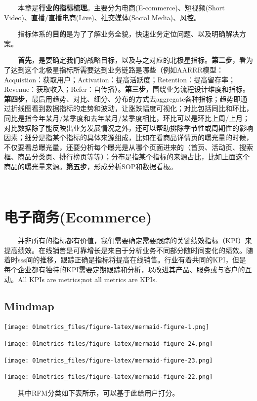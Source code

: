 \documentclass[
  letterpaper,
  DIV=11,
  numbers=noendperiod]{scrreprt}
\begin{document}
  本章是\textbf{行业的指标梳理}。主要分为电商(E-commerce)、短视频(Short
Video)、直播/直播电商(Live)、社交媒体(Social Media)、风控。

  指标体系的\textbf{目的}是为了了解业务全貌，快速业务定位问题、以及明确解决方案。

  \textbf{首先}，是要确定我们的战略目标，以及与之对应的北极星指标。\textbf{第二步}，看为了达到这个北极星指标所需要达到业务链路是哪些（例如AARRR模型：Acquistion：获取用户；Activation：提高活跃度；Retention：提高留存率；Revenue：获取收入；Refer：自传播）。\textbf{第三步}，围绕业务流程设计维度和指标。\textbf{第四步}，最后用趋势、对比、细分、分布的方式去aggregate各种指标；{趋势}即通过折线图看到数据指标的走势和波动，让涨跌幅度可视化；{对比}包括同比和环比，同比是指今年某月/某季度和去年某月/某季度相比，环比可以是环比上周/上月；对比数据除了能反映出业务发展情况之外，还可以帮助排除季节性或周期性的影响因素；{细分}是指某个指标的具体来源组成，比如在看商品详情页的曝光量的时候，不仅要看总曝光量，还要分析每个曝光是从哪个页面进来的（首页、活动页、搜索框、商品分类页、排行榜页等等）；{分布}是指某个指标的来源占比，比如上面这个商品的曝光量来源。\textbf{第五步}，形成分析SOP和数据看板。

  

\section{电子商务(Ecommerce)}\label{ux7535ux5b50ux5546ux52a1ecommerce}

  并非所有的指标都有价值，我们需要确定需要跟踪的关键绩效指标（KPI）来提高绩效。在线销售是可靠增长是来自于分析业务不同部分随时间变化的绩效。随着时sss间的推移，跟踪正确是指标将提高在线销售。行业有着共同的KPI，但是每个企业都有独特的KPI需要定期跟踪和分析，以改进其产品、服务或与客户的互动。All
KPIs are metrics;not all metrics are KPIs.

\subsection{Mindmap}\label{mindmap}

\texttt{[image: 01metrics\_files/figure-latex/mermaid-figure-1.png]}

\texttt{[image: 01metrics\_files/figure-latex/mermaid-figure-24.png]}

\texttt{[image: 01metrics\_files/figure-latex/mermaid-figure-23.png]}

\texttt{[image: 01metrics\_files/figure-latex/mermaid-figure-22.png]}

  其中RFM分类如下表所示，可以基于此给用户打分。
\end{document}
